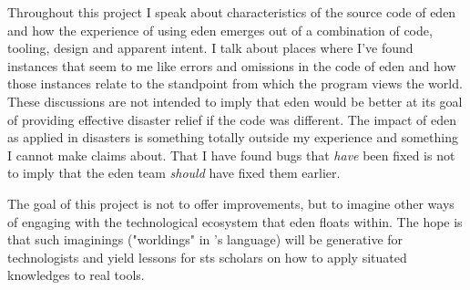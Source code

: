 \documentclass[a4paper,man,natbib]{apa6}
\begin{document}
   Throughout this project I speak about characteristics of the source code of \acrshort{eden} and how the experience of using \acrshort{eden} emerges out of a combination of code, tooling, design and apparent intent. I talk about places where I've found instances that seem to me like errors and omissions in the code of \acrshort{eden} and how those instances relate to the standpoint from which the program views the world. These discussions are not intended to imply that \acrshort{eden} would be better at its goal of providing effective disaster relief if the code was different. The impact of \acrshort{eden} as applied in disasters is something totally outside my experience and something I cannot make claims about. That I have found bugs that \textit{have} been fixed is not to imply that the \acrshort{eden} team \textit{should} have fixed them earlier.

   The goal of this project is not to offer improvements, but to imagine other ways of engaging with the technological ecosystem that \acrshort{eden} floats within. The hope is that such imaginings ("worldings" in \citet{Haraway2016-nc}'s language) will be generative for technologists and yield lessons for \acrlong{sts} scholars on how to apply situated knowledges to real tools. 
  
   \printnoidxglossaries
   \setlength{\parindent}{4em}
   
\end{document}
